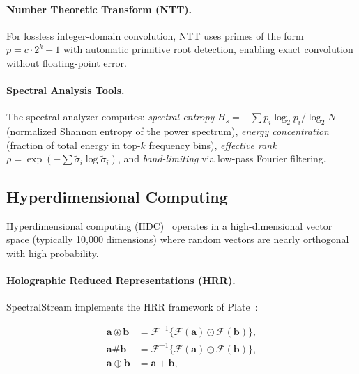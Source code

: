 \documentclass[11pt,a4paper,twocolumn]{article}
\begin{document}
\paragraph{Number Theoretic Transform (NTT).}
For lossless integer-domain convolution, NTT uses primes of the form $p = c \cdot 2^k + 1$ with automatic primitive root detection, enabling exact convolution without floating-point error.

\paragraph{Spectral Analysis Tools.}
The spectral analyzer computes: \emph{spectral entropy} $H_s = -\sum p_i \log_2 p_i / \log_2 N$ (normalized Shannon entropy of the power spectrum), \emph{energy concentration} (fraction of total energy in top-$k$ frequency bins), \emph{effective rank} $\rho = \exp(-\sum \tilde{\sigma}_i \log \tilde{\sigma}_i)$, and \emph{band-limiting} via low-pass Fourier filtering.

\subsection{Hyperdimensional Computing}
\label{sec:hdc}

Hyperdimensional computing (HDC)~\cite{kanerva2009hyperdimensional} operates in a high-dimensional vector space (typically 10,000 dimensions) where random vectors are nearly orthogonal with high probability.

\paragraph{Holographic Reduced Representations (HRR).}
SpectralStream implements the HRR framework of Plate~\cite{plate2003holographic}:

\begin{align}
	\label{eq:hrr_bind}
	\mathbf{a} \circledast \mathbf{b} & = \mathcal{F}^{-1}\{\mathcal{F}(\mathbf{a}) \odot \mathcal{F}(\mathbf{b})\},            \\
	\label{eq:hrr_unbind}
	\mathbf{a} \# \mathbf{b}          & = \mathcal{F}^{-1}\{\mathcal{F}(\mathbf{a}) \odot \overline{\mathcal{F}(\mathbf{b})}\}, \\
	\label{eq:hrr_bundle}
	\mathbf{a} \oplus \mathbf{b}      & = \mathbf{a} + \mathbf{b},
\end{align}
\end{document}
